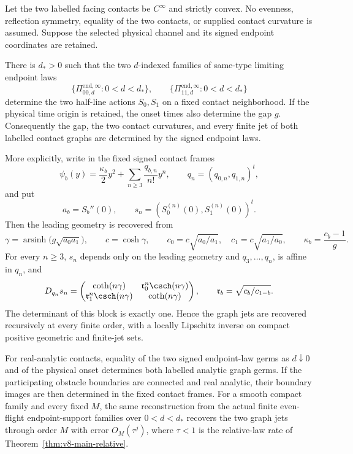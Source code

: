 \begin{theorem}
\label{thm:v19-signed-rigidity}
Let the two labelled facing contacts be $C^\infty$ and strictly convex.  No
evenness, reflection symmetry, equality of the two contacts, or supplied
contact curvature is assumed.  Suppose the selected physical channel and
its signed endpoint coordinates are retained.

There is $d_*>0$ such that the two $d$-indexed families of same-type
limiting endpoint laws
\[
 \{\Pi^{\mathrm{end},\infty}_{00,d}:0<d<d_*\},\qquad
 \{\Pi^{\mathrm{end},\infty}_{11,d}:0<d<d_*\}
\]
determine the two half-line actions $S_0,S_1$ on a fixed contact
neighborhood.  If the physical time origin is retained, the onset times
also determine the gap $g$.  Consequently the gap, the two contact
curvatures, and every finite jet of both labelled contact graphs are
determined by the signed endpoint laws.

More explicitly, write in the fixed signed contact frames
\begin{equation}\label{eq:v19-general-contact-jets}
 \psi_b(y)=\frac{\kappa_b}{2}y^2+
       \sum_{n\ge3}\frac{q_{b,n}}{n!}y^n,
 \qquad q_n=(q_{0,n},q_{1,n})^t,
\end{equation}
and put
\[
 a_b=S_b''(0),\qquad
 s_n=(S_0^{(n)}(0),S_1^{(n)}(0))^t.
\]
Then the leading geometry is recovered from
\begin{equation}\label{eq:v19-leading-recovery}
 \gamma=\operatorname{arsinh}\!\bigl(g\sqrt{a_0a_1}\bigr),\qquad
 c=\cosh\gamma,
 \qquad
 c_0=c\sqrt{a_0/a_1},\quad c_1=c\sqrt{a_1/a_0},
 \qquad
 \kappa_b=\frac{c_b-1}{g}.
\end{equation}
For every $n\ge3$, $s_n$ depends only on the leading geometry and
$q_3,\ldots,q_n$, is affine in $q_n$, and
\begin{equation}\label{eq:v19-general-jet-block}
 D_{q_n}s_n=
 \begin{pmatrix}
 \coth(n\gamma)&\mathfrak r_0^n\csch(n\gamma)\\
 \mathfrak r_1^n\csch(n\gamma)&\coth(n\gamma)
 \end{pmatrix},
 \qquad
 \mathfrak r_b=\sqrt{c_b/c_{1-b}}.
\end{equation}
The determinant of this block is exactly one.  Hence the graph jets are
recovered recursively at every finite order, with a locally Lipschitz
inverse on compact positive geometric and finite-jet sets.

For real-analytic contacts, equality of the two signed endpoint-law germs
as $d\downarrow0$ and of the physical onset determines both labelled
analytic graph germs. If the participating obstacle boundaries are
connected and real analytic, their boundary images are then determined in
the fixed contact frames. For a smooth compact family and every fixed $M$,
the same reconstruction from the actual finite even-flight endpoint-support
families over $0<d<d_*$ recovers the two graph jets through order $M$ with
error $O_M(\tau^j)$, where $\tau<1$ is the relative-law rate of
Theorem~\ref{thm:v8-main-relative}.
\end{theorem}

